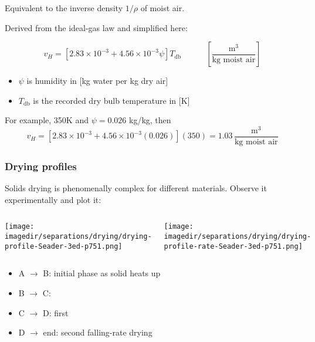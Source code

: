 \begin{frame}\frametitle{{\color{purple}{Humid volume}}}
	
	Equivalent to the inverse density $1/\rho$ of moist air.
	
	\vspace{12pt}
	Derived from the ideal-gas law and simplified here:
	\begin{exampleblock}{}
		\[ v_H = \left[ 2.83 \times 10^{-3} + 4.56 \times 10^{-3} \psi \right] T_\text{db} \qquad\quad \left[\frac{\text{m}^3}{\text{kg moist air}}\right] \]
	\end{exampleblock}
	\begin{itemize}
		\item	$\psi$ is humidity in [kg water per kg dry air]
		\item	$T_\text{db}$ is the recorded dry bulb temperature in [K]
	\end{itemize}
	
	\vspace{12pt}
	For example, 350K and $\psi = 0.026$ kg/kg, then 
	\[v_H = \left[2.83 \times 10^{-3} + 4.56 \times 10^{-3}(0.026)\right](350)  = 1.03\, \frac{\text{m}^3}{\text{kg moist air}}\]  
\end{frame}

\begin{frame}\frametitle{Drying profiles}
	Solids drying is phenomenally complex for different materials. Observe it experimentally and plot it:
	
	\hfill{}
	\vspace{-12pt}
	\begin{columns}[b]
			\begin{center}
				\texttt{[image: \\imagedir/separations/drying/drying-profile-Seader-3ed-p751.png]}
			\end{center}
			\begin{center}
				\texttt{[image: \\imagedir/separations/drying/drying-profile-rate-Seader-3ed-p751.png]}
			\end{center}
			\vspace{-7pt}
	\end{columns}

	\begin{itemize}
		\item	A $\rightarrow$ B: initial phase as solid heats up
		\item	B $\rightarrow$ C: {\color{purple}{constant-rate drying}}
		\item	C $\rightarrow$ D: first {\color{purple}{falling-rate drying}}
		\item	D $\rightarrow$ end: second falling-rate drying
	\end{itemize}
\end{frame}

